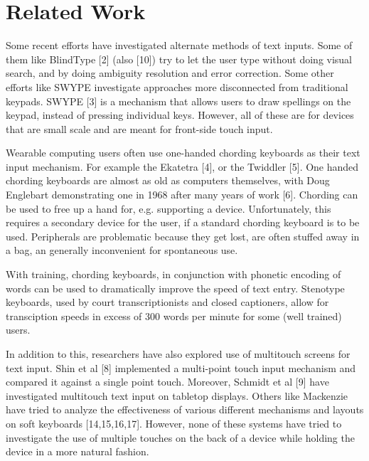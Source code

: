 \section{Related Work}

Some recent efforts have investigated alternate methods of text
inputs. Some of them like BlindType [2] (also [10]) try to
let the user type without doing visual search, and by doing ambiguity
resolution and error correction. Some other efforts like SWYPE investigate approaches more disconnected
from traditional keypads. SWYPE [3] is a mechanism that allows users to
draw spellings on the keypad, instead of pressing individual keys. However, all of these are for devices that are small scale and are meant for front-side touch input.

Wearable computing users often use one-handed chording keyboards as
their text input mechanism.  For example the Ekatetra [4], or the Twiddler [5].  One handed chording keyboards are almost
as old as computers themselves, with Doug Englebart demonstrating one
in 1968 after many years of work [6]. Chording can be
used to free up a hand for, e.g. supporting a device.  Unfortunately,
this requires a secondary device for the user, if a standard chording
keyboard is to be used.  Peripherals are problematic because they get
lost, are often stuffed away in a bag, an generally inconvenient for
spontaneous use.

With training, chording keyboards, in conjunction with phonetic
encoding of words can be used to dramatically improve the speed of
text entry.  Stenotype keyboards, used by court transcriptionists and
closed captioners, allow for transciption speeds in excess of 300
words per minute for some (well trained) users.

In addition to this, researchers have also explored use of multitouch screens for text input. Shin et al [8] implemented a multi-point touch input mechanism and compared it against a single point touch. Moreover, Schmidt et al [9] have investigated multitouch text input on tabletop displays. Others like Mackenzie have tried to analyze the effectiveness of various different mechanisms and layouts on soft keyboards [14,15,16,17]. However, none of these systems have tried to investigate the use of multiple touches on the back of a device while holding the device in a more natural fashion. 

